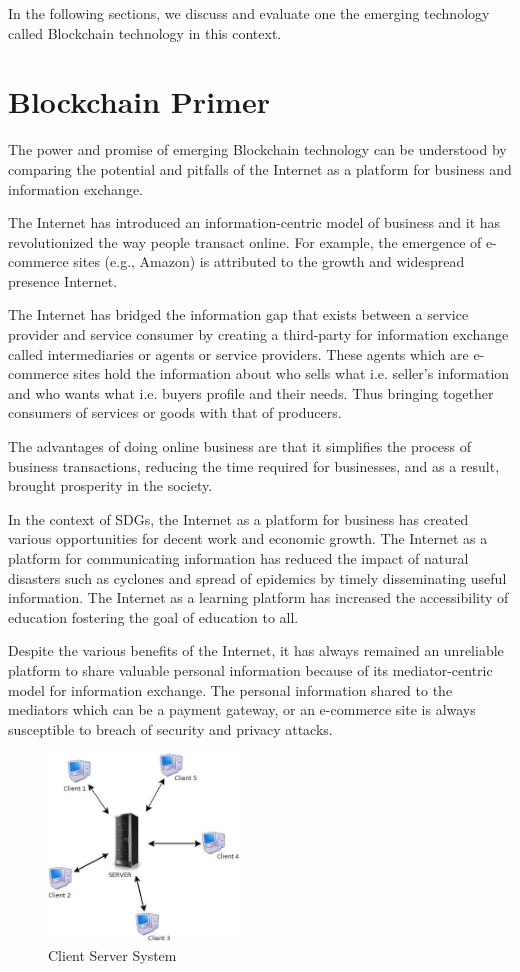\documentclass[10pt]{IETBook}
\begin{document}
In the following sections, we discuss and evaluate one the emerging technology called Blockchain technology in this context.

\section{Blockchain Primer}

The power and promise of emerging Blockchain technology can be understood by comparing the potential and pitfalls of the Internet as a platform for business and information exchange.

The Internet has introduced an information-centric model of business and it has revolutionized the way  people transact online. For example, the emergence of e-commerce sites (e.g., Amazon) is attributed to the growth and widespread presence Internet.

The Internet has bridged the information gap that exists between a service provider and service consumer by creating a third-party for information exchange called intermediaries or agents or service providers. These agents which are e-commerce sites hold the information about who sells what i.e. seller's information and who wants what i.e. buyers profile and their needs. Thus bringing together consumers of services or goods with that of producers.

The advantages of doing online business are that it simplifies the process of business transactions, reducing the time required for businesses, and as a result, brought prosperity in the society. 

In the context of SDGs, the Internet as a platform for business has created various opportunities for decent work and economic growth. The Internet as a platform for communicating information has reduced the impact of natural disasters such as cyclones and spread of epidemics by timely disseminating useful information. The Internet as a learning platform has increased the accessibility of education fostering the goal of education to all. 

Despite the various benefits of the Internet, it has always remained an unreliable platform to share valuable personal information because of its mediator-centric model for information exchange. The personal information shared to the mediators which can be a payment gateway, or an e-commerce site is always susceptible to breach of security and privacy attacks.

\begin{figure}[h]
	\centering
	\includegraphics[width=2in]{CS_Arch1}
	\caption{Client Server System}
\end{figure}
\end{document}
